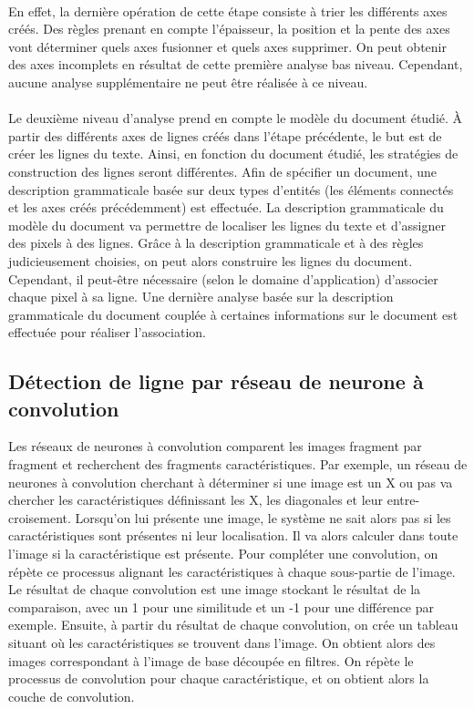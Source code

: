 \paragraph{}
En effet, la dernière opération de cette étape consiste à trier les différents axes créés. Des règles prenant en compte l'épaisseur,
la position et la pente des axes vont déterminer quels axes fusionner et quels axes supprimer. On peut obtenir des axes incomplets
en résultat de cette première analyse bas niveau. Cependant, aucune analyse supplémentaire ne peut être réalisée à ce niveau.

\paragraph{}
Le deuxième niveau d'analyse prend en compte le modèle du document étudié. À partir des différents axes de lignes créés dans l'étape
précédente, le but est de créer les lignes du texte. Ainsi, en fonction du document étudié, les stratégies de construction des lignes
seront différentes. Afin de spécifier un document, une description grammaticale basée sur deux types d'entités (les éléments connectés
et les axes créés précédemment) est effectuée. La description grammaticale du modèle du document va permettre de localiser les lignes
du texte et d'assigner des pixels à des lignes. Grâce à la description grammaticale et à des règles judicieusement choisies, on peut alors
construire les lignes du document. Cependant, il peut-être nécessaire (selon le domaine d'application) d'associer chaque pixel à sa ligne.
Une dernière analyse basée sur la description grammaticale du document couplée à certaines informations sur le document
est effectuée pour réaliser l'association.

\subsection{Détection de ligne par réseau de neurone à convolution}

Les réseaux de neurones à convolution comparent les images fragment par fragment et recherchent des fragments caractéristiques.
Par exemple, un réseau de neurones à convolution cherchant à déterminer si une image est un X ou pas va chercher les caractéristiques
définissant les X, les diagonales et leur entre-croisement. Lorsqu'on lui présente une image, le système ne sait alors pas si les
caractéristiques sont présentes ni leur localisation. Il va alors calculer dans toute l'image si la caractéristique est présente.
Pour compléter une convolution, on répète ce processus alignant les caractéristiques à chaque sous-partie de l'image.
Le résultat de chaque convolution est une image stockant le résultat de la comparaison, avec un 1 pour une similitude et un -1
pour une différence par exemple. Ensuite, à partir du résultat de chaque convolution, on crée un tableau situant où les
caractéristiques se trouvent dans l'image. On obtient alors des images correspondant à l'image de base découpée en filtres.
On répète le processus de convolution pour chaque caractéristique, et on obtient alors la couche de convolution.

